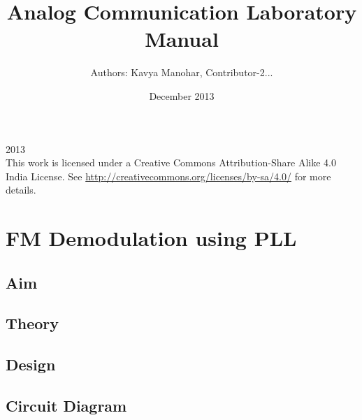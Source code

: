 \documentclass{book}
\begin{document}
\thispagestyle{empty}
\thispagestyle{empty}

\title{Analog Communication
Laboratory Manual}
\date{December 2013}
\author {Authors: Kavya Manohar, Contributor-2...}
\maketitle
  
\textcopyright{}2013
\\[5cm]
    This work is licensed under a Creative Commons Attribution-Share Alike 4.0 India License. See \url{http://creativecommons.org/licenses/by-sa/4.0/} for more details.






\thispagestyle{empty}
\tableofcontents
\thispagestyle{empty}
\thispagestyle{empty}

\listoffigures
\thispagestyle{empty}














\chapter[FM Demodulation using PLL]{FM Demodulation using PLL}
\section*{Aim}
\section*{Theory}
\section*{Design}
\section*{Circuit Diagram}
\end{document}
